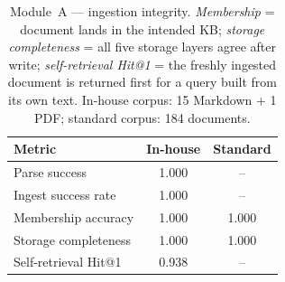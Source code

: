 \begin{table}[t]
\centering
\small
\caption{Module~A — ingestion integrity. \emph{Membership} = document lands in
the intended KB; \emph{storage completeness} = all five storage layers agree
after write; \emph{self-retrieval Hit@1} = the freshly ingested document is
returned first for a query built from its own text. In-house corpus: 15 Markdown +
1 PDF; standard corpus: 184 documents.}
\label{tab:ingestion}
\begin{tabular}{@{}lcc@{}}
\toprule
Metric & In-house & Standard \\
\midrule
Parse success              & 1.000 & -- \\
Ingest success rate        & 1.000 & -- \\
Membership accuracy        & 1.000 & 1.000 \\
Storage completeness       & 1.000 & 1.000 \\
Self-retrieval Hit@1       & 0.938 & -- \\
\bottomrule
\end{tabular}
\end{table}
